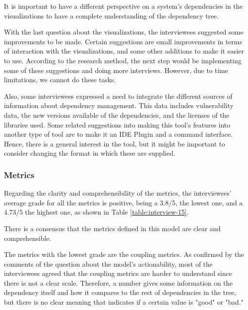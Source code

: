 \begin{finding}
	It is important to have a different perspective on a system's dependencies in the visualizations to have a complete understanding of the dependency tree.
	\label{find:different-perspectives}
\end{finding}

With the last question about the visualizations, the interviewees suggested some improvements to be made. Certain suggestions are small improvements in terms of interaction with the visualizations, and some other additions to make it easier to use. According to the research method, the next step would be implementing some of these suggestions and doing more interviews. However, due to time limitations, we cannot do these tasks.

Also, some interviewees expressed a need to integrate the different sources of information about dependency management. This data includes vulnerability data, the new versions available of the dependencies, and the licenses of the libraries used. Some related suggestions into making this tool's features into another type of tool are to make it an IDE Plugin and a command interface. Hence, there is a general interest in the tool, but it might be important to consider changing the format in which these are supplied.


\subsubsection{Metrics}
Regarding the clarity and comprehensibility of the metrics, the interviewees' average grade for all the metrics is positive, being a 3.8/5, the lowest one, and a 4.73/5 the highest one, as shown in Table \ref{table:interview-15}.

\begin{finding}
	There is a consensus that the metrics defined in this model are clear and comprehensible.
	\label{find:clear-comprehensible}
\end{finding}

The metrics with the lowest grade are the coupling metrics. As confirmed by the comments of the question about the model's actionability, most of the interviewees agreed that the coupling metrics are harder to understand since there is not a clear scale. Therefore, a number gives some information on the dependency itself and how it compares to the rest of dependencies in the tree, but there is no clear meaning that indicates if a certain value is "good" or "bad."

